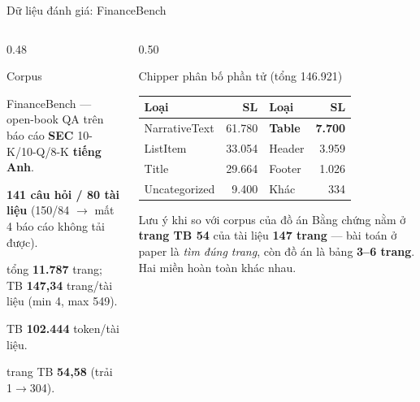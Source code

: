 \documentclass[aspectratio=169,11pt]{beamer}
\begin{document}
\begin{frame}{Dữ liệu đánh giá: FinanceBench}
  \begin{columns}[T]
    \begin{column}{0.48\textwidth}
      \begin{block}{\small Corpus}
        \begin{description}\small
          \item[Bộ] FinanceBench — open-book QA trên báo cáo \textbf{SEC}
            10-K/10-Q/8-K \textbf{tiếng Anh}.
          \item[Dùng được] \textbf{141 câu hỏi / 80 tài liệu}
            (150/84 $\rightarrow$ mất 4 báo cáo không tải được).
          \item[Trang] tổng \textbf{11.787} trang; TB \textbf{147,34} trang/tài liệu
            (min 4, max 549).
          \item[Token] TB \textbf{102.444} token/tài liệu.
          \item[Bằng chứng] trang TB \textbf{54,58} (trải 1$\rightarrow$304).
        \end{description}
      \end{block}
    \end{column}
    \begin{column}{0.50\textwidth}
      \begin{block}{\small Chipper phân bố phần tử (tổng 146.921)}
        \centering\footnotesize
        \begin{tabular}{@{}lr@{\quad}lr@{}}
          \toprule
          \textbf{Loại} & \textbf{SL} & \textbf{Loại} & \textbf{SL} \\
          \midrule
          NarrativeText & 61.780 & \textbf{Table} & \textbf{7.700} \\
          ListItem & 33.054 & Header & 3.959 \\
          Title & 29.664 & Footer & 1.026 \\
          Uncategorized & 9.400 & Khác & 334 \\
          \bottomrule
        \end{tabular}
      \end{block}
      \begin{alertblock}{\small Lưu ý khi so với corpus của đồ án}
        Bằng chứng nằm ở \textbf{trang TB 54} của tài liệu \textbf{147 trang} —
        bài toán ở paper là \emph{tìm đúng trang}, còn đồ án là bảng \textbf{3--6
        trang}. Hai miền hoàn toàn khác nhau.
      \end{alertblock}
    \end{column}
  \end{columns}
\end{frame}
\end{document}
